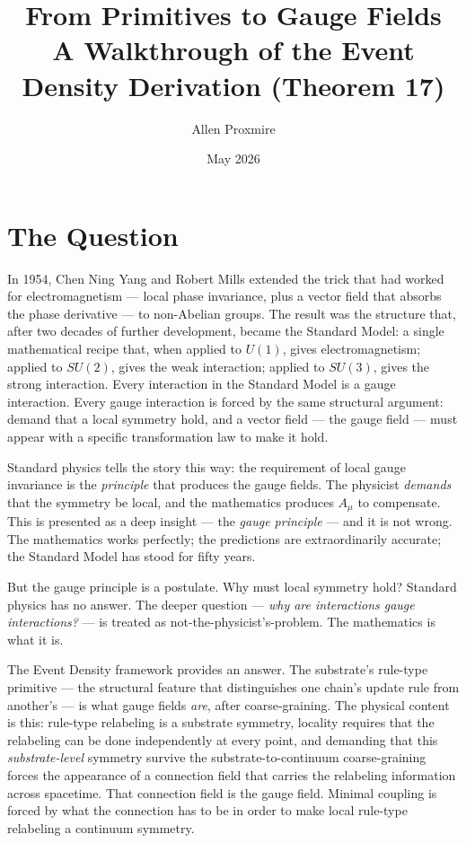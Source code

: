 \documentclass[11pt,a4paper]{article}
\title{\vspace{-1cm}\Large\bfseries From Primitives to Gauge Fields\\[6pt]
\large\mdseries A Walkthrough of the Event Density Derivation (Theorem 17)}
\author{Allen Proxmire}
\date{May 2026}
\begin{document}
\maketitle
\thispagestyle{empty}

\section{The Question}

In 1954, Chen Ning Yang and Robert Mills extended the trick that had worked for electromagnetism --- local phase invariance, plus a vector field that absorbs the phase derivative --- to non-Abelian groups. The result was the structure that, after two decades of further development, became the Standard Model: a single mathematical recipe that, when applied to $U(1)$, gives electromagnetism; applied to $SU(2)$, gives the weak interaction; applied to $SU(3)$, gives the strong interaction. Every interaction in the Standard Model is a gauge interaction. Every gauge interaction is forced by the same structural argument: demand that a local symmetry hold, and a vector field --- the gauge field --- must appear with a specific transformation law to make it hold.

Standard physics tells the story this way: the requirement of local gauge invariance is the \emph{principle} that produces the gauge fields. The physicist \emph{demands} that the symmetry be local, and the mathematics produces $A_\mu$ to compensate. This is presented as a deep insight --- the \emph{gauge principle} --- and it is not wrong. The mathematics works perfectly; the predictions are extraordinarily accurate; the Standard Model has stood for fifty years.

But the gauge principle is a postulate. Why must local symmetry hold? Standard physics has no answer. The deeper question --- \emph{why are interactions gauge interactions?} --- is treated as not-the-physicist's-problem. The mathematics is what it is.

The Event Density framework provides an answer. The substrate's rule-type primitive --- the structural feature that distinguishes one chain's update rule from another's --- is what gauge fields \emph{are}, after coarse-graining. The physical content is this: rule-type relabeling is a substrate symmetry, locality requires that the relabeling can be done independently at every point, and demanding that this \emph{substrate-level} symmetry survive the substrate-to-continuum coarse-graining forces the appearance of a connection field that carries the relabeling information across spacetime. That connection field is the gauge field. Minimal coupling is forced by what the connection has to be in order to make local rule-type relabeling a continuum symmetry.
\end{document}
